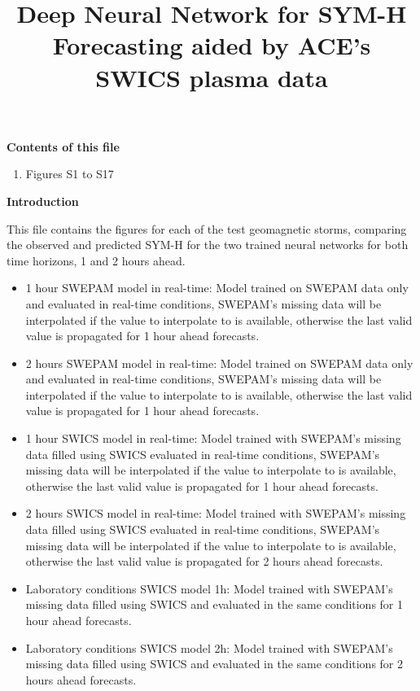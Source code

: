 \documentclass[draft,sw]{agutexSI2019}
\begin{document}
\title{Deep Neural Network for SYM-H Forecasting aided by ACE's SWICS plasma data}



\begin{article}

\renewcommand\tablename{Figure}

\noindent\textbf{Contents of this file}
\begin{enumerate}
\item Figures S1 to S17
\end{enumerate}

\noindent\textbf{Introduction}

This file contains the figures for each of the test geomagnetic storms, comparing the observed and predicted SYM-H for the two trained neural networks for both time horizons, 1 and 2 hours ahead. 

\begin{itemize}
    \item 1 hour SWEPAM model in real-time: Model trained on SWEPAM data only and evaluated in real-time conditions, SWEPAM's missing data will be interpolated if the value to interpolate to is available, otherwise the last valid value is propagated for 1 hour ahead forecasts.
    \item 2 hours SWEPAM model in real-time: Model trained on SWEPAM data only and evaluated in real-time conditions, SWEPAM's missing data will be interpolated if the value to interpolate to is available, otherwise the last valid value is propagated for 1 hour ahead forecasts.
    \item 1 hour SWICS model in real-time: Model trained with SWEPAM's missing data filled using SWICS evaluated in real-time conditions, SWEPAM's missing data will be interpolated if the value to interpolate to is available, otherwise the last valid value is propagated for 1 hour ahead forecasts.
    \item 2 hours SWICS model in real-time: Model trained with SWEPAM's missing data filled using SWICS evaluated in real-time conditions, SWEPAM's missing data will be interpolated if the value to interpolate to is available, otherwise the last valid value is propagated for 2 hours ahead forecasts.
	\item Laboratory conditions SWICS model 1h: Model trained with SWEPAM's missing data filled using SWICS and evaluated in the same conditions for 1 hour ahead forecasts.
    \item Laboratory conditions SWICS model 2h: Model trained with SWEPAM's missing data filled using SWICS and evaluated in the same conditions for 2 hours ahead forecasts.

    
\end{itemize}


\end{article}
\clearpage
\end{document}
